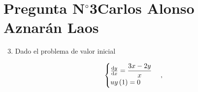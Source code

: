 \section{Pregunta N$^{\circ}$3\qquad Carlos Alonso Aznarán Laos}

\begin{frame}
    \begin{enumerate}\setcounter{enumi}{2}
        \item

              Dado el problema de valor inicial

              \begin{equation}
                  \begin{cases}
                      \diff{y}{x}=\dfrac{3x-2y}{x}
                       & \\
                      u
                      y\left(1\right)=0
                       &
                  \end{cases},
              \end{equation}

    \end{enumerate}

    \begin{solution}

    \end{solution}
\end{frame}